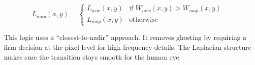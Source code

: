 \documentclass[conference]{IEEEtran}
\begin{document}
\begin{equation} \label{eq:max_weight}
L_{map}(x, y) = \begin{cases} 
L_{new}(x, y) & \text{if } W_{new}(x, y) > W_{map}(x, y) \\
L_{map}(x, y) & \text{otherwise}
\end{cases}
\end{equation}

This logic uses a ``closest-to-nadir'' approach. It removes ghosting by requiring a firm decision at the pixel level for high-frequency details. The Laplacian structure makes sure the transition stays smooth for the human eye.





\end{document}
